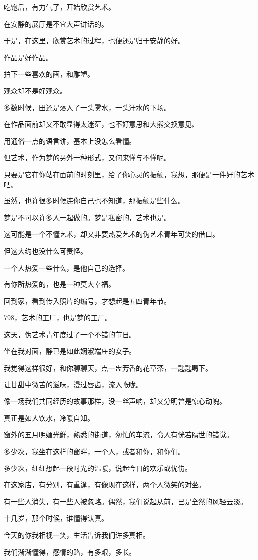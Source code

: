 \documentclass[12pt,a4paper]{article}
\begin{document}
		吃饱后，有力气了，开始欣赏艺术。\par
		在安静的展厅是不宜大声讲话的。\par
		于是，在这里，欣赏艺术的过程，也便还是归于安静的好。

		作品是好作品。\par
		拍下一些喜欢的画，和雕塑。

		观众却不是好观众。\par
		多数时候，田还是落入了一头雾水，一头汗水的下场。\par
		在作品面前却又不敢显得太迷茫，也不好意思和大熊交换意见。\par
		用通俗一点的语言讲，基本上没怎么看懂。\par
		但艺术，作为梦的另外一种形式，又何来懂与不懂呢。\par
		只要是它在你站在面前的时刻里，给了你心灵的振颤，我想，那便是一件好的艺术吧。\par
		虽然，也许很多时候连你自己也不知道，那振颤是些什么。\par
		梦是不可以许多人一起做的。梦是私密的，艺术也是。\par
		这可能是一个不懂艺术，却又非要热爱艺术的伪艺术青年可笑的借口。\par
		但这大约也没什么可责怪。\par
		一个人热爱一些什么，是他自己的选择。\par
		有你所热爱的，也是一种莫大幸福。

		回到家，看到传入照片的编号，才想起是五四青年节。\par
		798，艺术的工厂，也是梦的工厂。\par
		这天，伪艺术青年度过了一个不错的节日。

	\endwriting



		坐在我对面，静已是如此娴淑端庄的女子。


		我觉得这样很好，和你聊聊天，点一盅芳香的花草茶，一匙匙喝下。\par
		让甘甜中微苦的滋味，漫过唇齿，流入喉咙。\par
		像一场我们共同经历的故事那样，没一丝声响，却又分明曾是惊心动魄。\par
		真正是如人饮水，冷暖自知。

		窗外的五月明媚光鲜，熟悉的街道，匆忙的车流，令人有恍若隔世的错觉。\par
		多少次，我坐在这样的窗畔，一个人，或者和你，和你们。\par
		多少次，细细想起一段时光的温暖，说起今日的欢乐或忧伤。\par
		在这家店，有分别，有重逢，有像现在这样，两个人微笑的对坐。\par
		有一些人消失，有一些人被忽略。偶然，我们说起从前，已是全然的风轻云淡。\par
		十几岁，那个时候，谁懂得认真。\par
		今天的你我相视一笑，生活告诉我们许多真相。\par
		我们渐渐懂得，感情的路，有多艰，多长。
\end{document}
